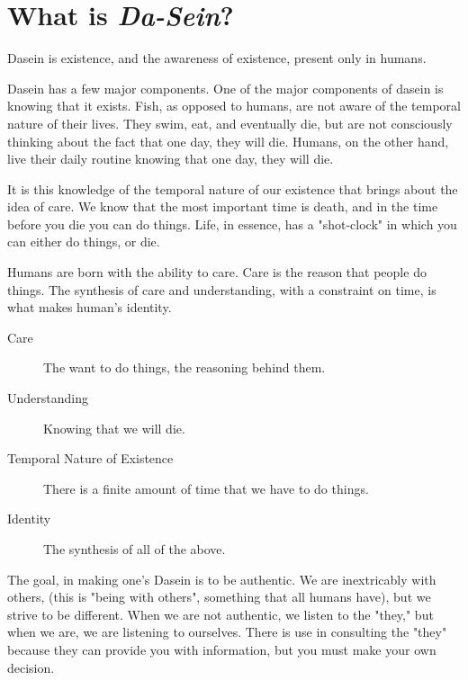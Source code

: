 \section{What is \textit{Da-Sein}?}
Dasein is existence, and the awareness of existence, present only in humans.

Dasein has a few major components. One of the major components of dasein is
knowing that it exists. Fish, as opposed to humans, are not aware of the
temporal nature of their lives. They swim, eat, and eventually die, but are not
consciously thinking about the fact that one day, they will die. Humans, on the
other hand, live their daily routine knowing that one day, they will die.

It is this knowledge of the temporal nature of our existence that brings about
the idea of care. We know that the most important time is death, and in the time
before you die you can do things. Life, in essence, has a "shot-clock" in which
you can either do things, or die.

Humans are born with the ability to care. Care is the reason that people do
things. The synthesis of care and understanding, with a constraint on time, is
what makes human's identity.

\begin{description}
  \item[Care] The want to do things, the reasoning behind them.
  \item[Understanding] Knowing that we will die.
  \item[Temporal Nature of Existence] There is a finite amount of time that we
    have to do things.
  \item[Identity] The synthesis of all of the above.
\end{description}

The goal, in making one's Dasein is to be authentic. We are inextricably with
others, (this is "being with others", something that all humans have), but we
strive to be different. When we are not authentic, we listen to the "they," but
when we are, we are listening to ourselves. There is use in consulting the
"they" because they can provide you with information, but you must make your own
decision.
